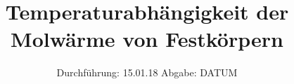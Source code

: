 

\subject{V 47}
\title{Temperaturabhängigkeit der Molwärme von Festkörpern}
\date{
  Durchführung: 15.01.18
  \hspace{3em}
  Abgabe: DATUM
}



\maketitle
\thispagestyle{empty}
\tableofcontents
\newpage
\setcounter{page}{1}





\printbibliography


